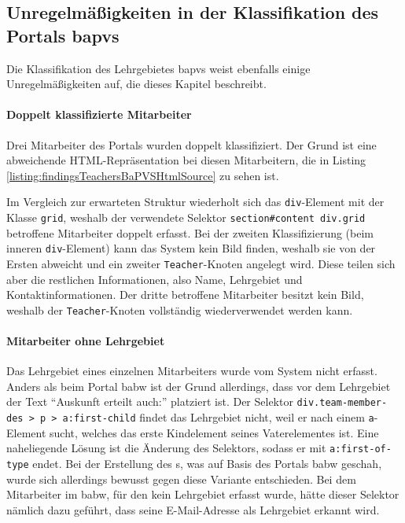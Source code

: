 \subsection{Unregelmäßigkeiten in der Klassifikation des Portals \acrshort{bapvs}}
    \label{section:findingsTeachersAbnormalitiesBaPVS}
    Die Klassifikation des Lehrgebietes \gls{bapvs}
    weist ebenfalls einige Unregelmäßigkeiten auf,
    die dieses Kapitel beschreibt.

    \paragraph*{Doppelt klassifizierte Mitarbeiter}
    Drei Mitarbeiter des Portals wurden doppelt klassifiziert.
    Der Grund ist eine abweichende HTML-Repräsentation bei diesen Mitarbeitern,
    die in Listing \ref{listing:findingsTeachersBaPVSHtmlSource} zu sehen ist.

    

    Im Vergleich zur erwarteten Struktur wiederholt sich
    das \texttt{div}-Element mit der Klasse \texttt{grid},
    weshalb der verwendete Selektor \texttt{section\#content div.grid}
    betroffene Mitarbeiter doppelt erfasst.
    Bei der zweiten Klassifizierung
    (beim inneren \texttt{div}-Element) kann das System kein Bild finden,
    weshalb sie von der Ersten abweicht und ein zweiter \texttt{Teacher}-Knoten angelegt wird.
    Diese teilen sich aber die restlichen Informationen,
    also Name, Lehrgebiet und Kontaktinformationen.
    Der dritte betroffene Mitarbeiter besitzt kein Bild,
    weshalb der \texttt{Teacher}-Knoten vollständig wiederverwendet werden kann.

    \paragraph*{Mitarbeiter ohne Lehrgebiet}
    Das Lehrgebiet eines einzelnen Mitarbeiters wurde vom System nicht erfasst.
    Anders als beim Portal \gls{babw} ist der Grund allerdings,
    dass vor dem Lehrgebiet der Text "`Auskunft erteilt auch:"' platziert ist.
    Der Selektor \texttt{div.team-member-des > p > a:first-child} findet
    das Lehrgebiet nicht, weil er nach einem \texttt{a}-Element sucht,
    welches das erste Kindelement seines Vaterelementes ist.
    Eine naheliegende Lösung ist die Änderung des Selektors,
    sodass er mit \texttt{a:first-of-type} endet.
    Bei der Erstellung des {\classificationModel}s,
    was auf Basis des Portals \gls{babw} geschah,
    wurde sich allerdings bewusst gegen diese Variante entschieden.
    Bei dem Mitarbeiter im \gls{babw}, für den kein Lehrgebiet erfasst
    wurde,
    hätte dieser Selektor nämlich dazu geführt,
    dass seine E-Mail-Adresse als Lehrgebiet erkannt wird.

